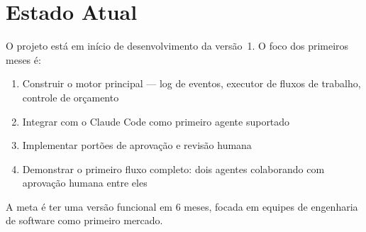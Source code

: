 \documentclass[12pt, a4paper]{article}
\begin{document}
\section{Estado Atual}

O projeto está em início de desenvolvimento da versão~1. O foco dos primeiros meses é:

\begin{enumerate}[leftmargin=1.5em]
    \item Construir o motor principal --- log de eventos, executor de fluxos de trabalho, controle de orçamento
    \item Integrar com o Claude Code como primeiro agente suportado
    \item Implementar portões de aprovação e revisão humana
    \item Demonstrar o primeiro fluxo completo: dois agentes colaborando com aprovação humana entre eles
\end{enumerate}

A meta é ter uma versão funcional em 6 meses, focada em equipes de engenharia de software como primeiro mercado.
\end{document}
